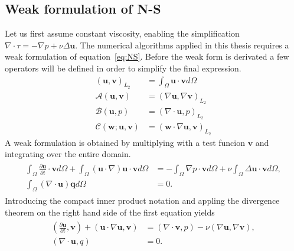 \subsection{Weak formulation of N-S}
Let us first assume constant viscosity, enabling the simplification $\nabla \cdot \tau = -\nabla p + \nu \Delta \mathbf{u}$.
The numerical algorithms applied in this thesis requires a weak formulation of equation~\ref{eq:NS}.
Before the weak form is derivated a few operators will be defined in order to simplify the final 
expression.
%
\begin{align}
    ( \mathbf{u},\mathbf{v})_{L_2} &= \int_{\Omega}\mathbf{u} \cdot \mathbf{v} d\Omega\\
    \mathcal{A}(\mathbf{u},\mathbf{v}) &= (\nabla \mathbf{u},\nabla \mathbf{v})_{L_2}\\
    \mathcal{B}(\mathbf{u},p) &= (\nabla \cdot \mathbf{u},p)_{L_2}\\
    \mathcal{C}(\mathbf{w};\mathbf{u},\mathbf{v}) &= (\mathbf{w}\cdot \nabla \mathbf{u},\mathbf{v})_{L_2}
    \label{eq:weakoperators}
\end{align}
%
A weak formulation is obtained by multiplying with a test funcion $\mathbf{v}$ and integrating over
the entire domain.
\begin{align}
    \begin{split}
        \int_{\Omega}\frac{\partial \mathbf{u}}{\partial t}\cdot\mathbf{v}d\Omega
        + \int_{\Omega}(\mathbf{u}\cdot \nabla)\mathbf{u}\cdot\mathbf{v}d\Omega
        &= -\int_{\Omega}\nabla p\cdot \mathbf{v} d\Omega 
        + \nu \int_{\Omega}\Delta\mathbf{u}\cdot\mathbf{v}d\Omega, \\
		\int_{\Omega}(\nabla \cdot \mathbf{u}) \mathbf{q}d\Omega &= 0.
    \end{split}
	\label{eq:NSweak1}
\end{align}
Introducing the compact inner product notation and appling the divergence theorem on the right hand side of 
the first equation yields
\begin{align}
    \begin{split}
        (\frac{\partial \mathbf{u}}{\partial t},\mathbf{v})
        + (\mathbf{u}\cdot \nabla\mathbf{u},\mathbf{v})
        &= (\nabla \cdot \mathbf{v} , p ) 
        -\nu(\nabla \mathbf{u},\nabla \mathbf{v}), \\
		(\nabla \cdot \mathbf{u},q) &= 0.
    \end{split}
	\label{eq:NSweak}
\end{align}
